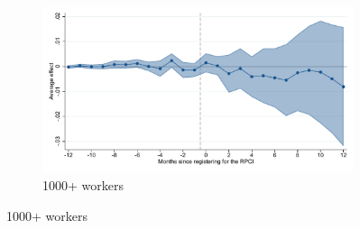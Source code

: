 \begin{figure}[H]
    \begin{subfigure}{0.32\textwidth}
    \caption{1000+ workers}
    \includegraphics[width=\textwidth]{04_Figures/muestra_10porciento/event_study_alta_size_1001_dcdh_connected.pdf}
    \end{subfigure}
    
\end{figure}

\clearpage

